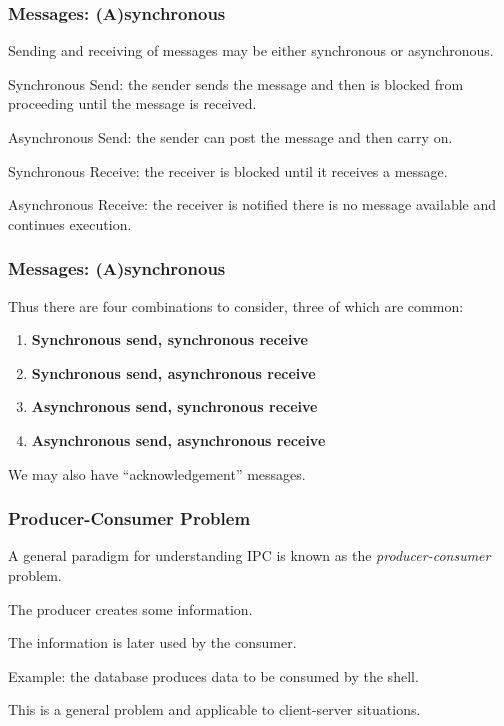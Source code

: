 \begin{frame}
\frametitle{Messages: (A)synchronous}

Sending and receiving of messages may be either synchronous or asynchronous. 

Synchronous Send: the sender sends the message and then is blocked from proceeding until the message is received. 

Asynchronous Send: the sender can post the message and then carry on. 

Synchronous Receive: the receiver is blocked until it receives a message. 

Asynchronous Receive: the receiver is notified there is no message available and continues execution.

\end{frame}

\begin{frame}
\frametitle{Messages: (A)synchronous}

Thus there are four combinations to consider, three of which are common:

\begin{enumerate}
	\item \textbf{Synchronous send, synchronous receive} 
	\item \textbf{Synchronous send, asynchronous receive}
	\item \textbf{Asynchronous send, synchronous receive}
	\item \textbf{Asynchronous send, asynchronous receive}
\end{enumerate}

We may also have ``acknowledgement'' messages.

\end{frame}

\begin{frame}
\frametitle{Producer-Consumer Problem}

A general paradigm for understanding IPC is known as the \textit{producer-consumer} problem. 

The \alert{producer} creates some information.

The information is later used by the \alert{consumer}. 

Example: the database produces data to be consumed by the shell. 

This is a general problem and applicable to client-server situations.

\end{frame}

